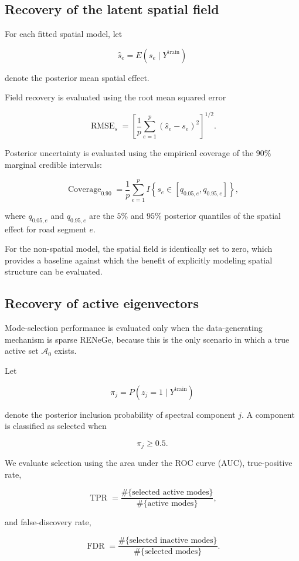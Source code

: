 \documentclass[11pt]{article}
\begin{document}
\subsection{Recovery of the latent spatial field}

For each fitted spatial model, let

\[
\widehat s_e
=
E(s_e\mid Y^{\mathrm{train}})
\]

denote the posterior mean spatial effect.

Field recovery is evaluated using the root mean squared error

\[
\operatorname{RMSE}_s
=
\left[
\frac{1}{p}
\sum_{e=1}^{p}
(\widehat s_e-s_e)^2
\right]^{1/2}.
\]

Posterior uncertainty is evaluated using the empirical coverage of the $90\%$ marginal credible intervals:

\[
\operatorname{Coverage}_{0.90}
=
\frac{1}{p}
\sum_{e=1}^{p}
I
\left\{
s_e
\in
[q_{0.05,e},q_{0.95,e}]
\right\},
\]

where $q_{0.05,e}$ and $q_{0.95,e}$ are the $5\%$ and $95\%$ posterior quantiles of the spatial effect for road segment $e$.

For the non-spatial model, the spatial field is identically set to zero, which provides a baseline against which the benefit of explicitly modeling spatial structure can be evaluated.

\subsection{Recovery of active eigenvectors}

Mode-selection performance is evaluated only when the data-generating mechanism is sparse RENeGe, because this is the only scenario in which a true active set $\mathcal{A}_0$ exists.

Let

\[
\pi_j
=
P(z_j=1\mid Y^{\mathrm{train}})
\]

denote the posterior inclusion probability of spectral component $j$. A component is classified as selected when

\[
\pi_j\geq0.5.
\]

We evaluate selection using the area under the ROC curve (AUC), true-positive rate,

\[
\operatorname{TPR}
=
\frac{\#\{\text{selected active modes}\}}
{\#\{\text{active modes}\}},
\]

and false-discovery rate,

\[
\operatorname{FDR}
=
\frac{\#\{\text{selected inactive modes}\}}
{\#\{\text{selected modes}\}}.
\]
\end{document}
